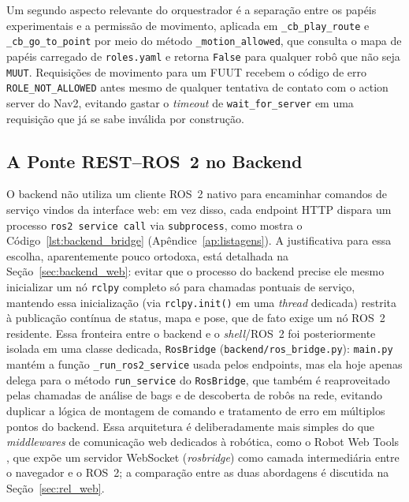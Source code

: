 Um segundo aspecto relevante do orquestrador é a separação entre os papéis
experimentais e a permissão de movimento, aplicada em \texttt{\_\allowbreak cb\_\allowbreak play\_\allowbreak route}
e \texttt{\_\allowbreak cb\_\allowbreak go\_\allowbreak to\_\allowbreak point} por meio do método \texttt{\_\allowbreak motion\_\allowbreak allowed},
que consulta o mapa de papéis carregado de \texttt{roles.yaml} e retorna
\texttt{False} para qualquer robô que não seja \texttt{MUUT}. Requisições de
movimento para um FUUT recebem o código de erro \texttt{ROLE\_\allowbreak NOT\_\allowbreak ALLOWED}
antes mesmo de qualquer tentativa de contato com o action server do Nav2,
evitando gastar o \textit{timeout} de \texttt{wait\_\allowbreak for\_\allowbreak server} em uma
requisição que já se sabe inválida por construção.

\subsection{A Ponte REST--ROS~2 no Backend}
\label{sec:impl_backend_ponte}

O backend não utiliza um cliente ROS~2 nativo para encaminhar comandos de
serviço vindos da interface web: em vez disso, cada endpoint HTTP dispara
um processo \texttt{ros2 service call} via \texttt{subprocess}, como mostra
o Código~\ref{lst:backend_bridge} (Apêndice~\ref{ap:listagens}). A justificativa para essa escolha, aparentemente
pouco ortodoxa, está detalhada na Seção~\ref{sec:backend_web}: evitar que o
processo do backend precise ele mesmo inicializar um nó \texttt{rclpy} completo
só para chamadas pontuais de serviço, mantendo essa inicialização (via
\texttt{rclpy.init()} em uma \textit{thread} dedicada) restrita à publicação
contínua de status, mapa e pose, que de fato exige um nó ROS~2 residente.
Essa fronteira entre o backend e o \textit{shell}/ROS~2 foi posteriormente
isolada em uma classe dedicada, \texttt{RosBridge} (\texttt{backend/\allowbreak ros\_\allowbreak bridge.py}):
\texttt{main.py} mantém a função \texttt{\_\allowbreak run\_\allowbreak ros2\_\allowbreak service} usada pelos endpoints,
mas ela hoje apenas delega para o método \texttt{run\_\allowbreak service} do \texttt{RosBridge},
que também é reaproveitado pelas chamadas de análise de bags e de descoberta
de robôs na rede, evitando duplicar a lógica de montagem de comando e
tratamento de erro em múltiplos pontos do backend. Essa arquitetura é
deliberadamente mais simples do que \textit{middlewares} de comunicação web
dedicados à robótica, como o Robot Web Tools \cite{toris2015}, que expõe um
servidor WebSocket (\textit{rosbridge}) como camada intermediária entre o
navegador e o ROS~2; a comparação entre as duas abordagens é discutida na
Seção~\ref{sec:rel_web}.

